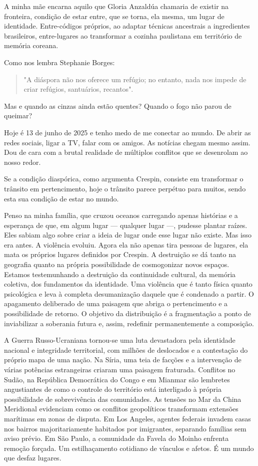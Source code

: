 A minha mãe encarna aquilo que Gloria Anzaldúa chamaria de existir na
fronteira, condição de estar entre, que se torna, ela mesma, um lugar de
identidade. Entre-códigos próprios, ao adaptar técnicas ancestrais a
ingredientes brasileiros, entre-lugares ao transformar a cozinha
paulistana em território de memória coreana.

Como nos lembra Stephanie Borges:

\begin{quote}
"A diáspora não nos oferece um refúgio; no entanto, nada nos impede de
criar refúgios, santuários, recantos".
\end{quote}

Mas e quando as cinzas ainda estão quentes? Quando o fogo não parou de
queimar?

Hoje é 13 de junho de 2025 e tenho medo de me conectar ao mundo. De
abrir as redes sociais, ligar a TV, falar com os amigos. As notícias
chegam mesmo assim. Dou de cara com a brutal realidade de múltiplos
conflitos que se desenrolam ao nosso redor.

Se a condição diaspórica, como argumenta Crespin, consiste em
transformar o trânsito em pertencimento, hoje o trânsito parece perpétuo
para muitos, sendo esta sua condição de estar no mundo.

Penso na minha família, que cruzou oceanos carregando apenas histórias e
a esperança de que, em algum lugar --- qualquer lugar ---, pudesse
plantar raízes. Eles sabiam algo sobre criar a ideia de lugar onde esse
lugar não existe. Mas isso era antes. A violência evoluiu. Agora ela não
apenas tira pessoas de lugares, ela mata os próprios lugares definidos
por Crespin. A destruição se dá tanto na geografia quanto na própria
possibilidade de cosmogonizar novos espaços. Estamos testemunhando a
destruição da continuidade cultural, da memória coletiva, dos
fundamentos da identidade. Uma violência que é tanto física quanto
psicológica e leva à completa desumanização daquele que é condenado a
partir. O apagamento deliberado de uma paisagem que abriga o
pertencimento e a possibilidade de retorno. O objetivo da distribuição é
a fragmentação a ponto de inviabilizar a soberania futura e, assim,
redefinir permanentemente a composição.

A Guerra Russo-Ucraniana tornou-se uma luta devastadora pela identidade
nacional e integridade territorial, com milhões de deslocados e a
contestação do próprio mapa de uma nação. Na Síria, uma teia de facções
e a intervenção de várias potências estrangeiras criaram uma paisagem
fraturada. Conflitos no Sudão, na República Democrática do Congo e em
Mianmar são lembretes angustiantes de como o controle do território está
interligado à própria possibilidade de sobrevivência das comunidades. As
tensões no Mar da China Meridional evidenciam como os conflitos
geopolíticos transformam extensões marítimas em zonas de disputa. Em Los
Angeles, agentes federais invadem casas nos bairros majoritariamente
habitados por imigrantes, separando famílias sem aviso prévio. Em São
Paulo, a comunidade da Favela do Moinho enfrenta remoção forçada. Um
estilhaçamento cotidiano de vínculos e afetos. É um mundo que desfaz
lugares.

